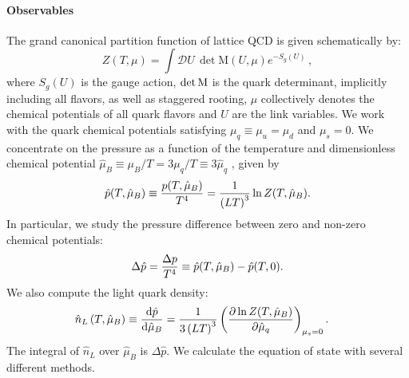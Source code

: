\documentclass[twocolumn,showpacs,preprintnumbers,amsmath,amssymb,latexsym,prl,footinbib,floatfix,superscriptaddress]{revtex4-2}
\newcommand{\f}[2]{\frac{#1}{#2}}
\newcommand{\Dmeas}{\mathcal{D}}
\begin{document}
\paragraph{Observables}
The grand canonical partition function of lattice QCD is given schematically by:
\begin{equation}
    Z(T,\mu) = \int \Dmeas U\, \det {\textrm{M}}(U,\mu)  e^{-S_g(U)}\,,
\end{equation}
where $S_g(U)$ is the gauge action, $\det \rm{M}$ is the quark determinant, implicitly 
including all flavors, as well as staggered rooting, $\mu$ collectively denotes the
chemical potentials of all quark flavors and $U$ are the link variables. 
We work with the quark chemical potentials 
satisfying $\mu_q \equiv \mu_u=\mu_d$ and $\mu_s=0$.
We concentrate on 
the pressure as 
a function of the temperature and 
dimensionless chemical 
potential $\hat{\mu}_B \equiv \mu_B /T = 3 \mu_q / T \equiv 3 \hat{\mu}_q$
, given by
\begin{equation}
    \hat{p}(T,\hat{\mu}_B) \equiv \frac{p(T, \hat{\mu}_B)}{T^4} = \frac{1}{\left( LT \right)^3} \ln Z(T, \hat{\mu}_B)\rm{.} 
\end{equation}
In particular, we study the pressure difference between zero 
and non-zero chemical potentials:
\begin{equation}
    \Delta \hat{p} = \frac{\Delta p}{T^4} \equiv \hat{p}(T,\hat{\mu}_B) - \hat{p}(T,0)\rm{.}
\end{equation}
We also compute the light quark density:
\begin{equation}
    \begin{aligned}
        \hat{n}_L \left( T, \hat{\mu}_B \right) 
        &\equiv \f{{\rm{d}} \hat{p}}{{\rm{d}} \hat{\mu}_B} = \frac{1}{3 \left( L T \right)^3} \left( \f{\partial
        \ln Z(T,\hat{\mu}_B)}{\partial \hat{\mu}_q} \right)_{\mu_s=0}\rm{.}
    \end{aligned}
\end{equation}
The integral of $\hat{n}_L$ over $\hat{\mu}_B$ is $\Delta \hat{p}$. 
We calculate the equation of state with several different methods.
\end{document}
